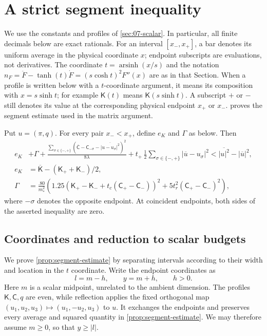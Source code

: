 \section{A strict segment inequality}\label{sec:08-segments}

We use the constants and profiles of \cref{sec:07-scalar}. In particular, all finite decimals below are exact rationals. For an interval $[x_-,x_+]$, a bar denotes its uniform average in the physical coordinate $x$; endpoint subscripts are evaluations, not derivatives. The coordinate $t=\operatorname{arsinh}(x/s)$ and the notation $n_F=\ddot F-\tanh(t)\dot F=(s\cosh t)^2F''(x)$ are as in that Section. When a profile is written below with a $t$-coordinate argument, it means its composition with $x=s\sinh t$; for example $\mathsf K(t)$ means $\mathsf K(s\sinh t)$. A subscript $+$ or $-$ still denotes its value at the corresponding physical endpoint $x_+$ or $x_-$.  proves the segment estimate used in the matrix argument.

\begin{proposition}\label{prop:segment-estimate}
Put $u=(\pi,q)$. For every pair $x_-<x_+$, define $e_K$ and $\Gamma$ as below. Then
\[
\begin{aligned}
 e_K&+\Gamma+
 \frac{\sum_{\sigma\in\{-,+\}}(\overline{\mathsf C}-\mathsf C_{-\sigma}
                     -\overline{|u-u_\sigma|^2})^2}{8\lambda}
 +t_+\,\frac12\sum_{\sigma\in\{-,+\}}|\overline u-u_\sigma|^2
 < \overline{|u|^2}-|\overline u|^2,\\
 e_K&=\overline{\mathsf K}-(\mathsf K_++\mathsf K_-)/2,\\
 \Gamma&=\frac{.80}{m_*^2}
 \left(1.25(\mathsf K_+-\mathsf K_-+t_c(\mathsf C_+-\mathsf C_-))^2+
             5t_r^2(\mathsf C_+-\mathsf C_-)^2\right),
\end{aligned}
\]
where $-\sigma$ denotes the opposite endpoint. At coincident endpoints, both sides of the asserted inequality are zero.
\end{proposition}

\subsection{Coordinates and reduction to scalar budgets}
\label{subsec:segments-reduction}

We prove \cref{prop:segment-estimate} by separating intervals according to their width and location in the $t$ coordinate. Write the endpoint coordinates as
\[
 l=m-h,\qquad y=m+h,\qquad h>0.
\]
Here $m$ is a scalar midpoint, unrelated to the ambient dimension. The profiles $\mathsf K,\mathsf C,q$ are even, while reflection applies the fixed orthogonal map $(u_1,u_2,u_3)\mapsto(u_1,-u_2,u_3)$ to $u$. It exchanges the endpoints and preserves every average and squared quantity in \cref{prop:segment-estimate}. We may therefore assume $m\ge0$, so that $y\ge|l|$.

